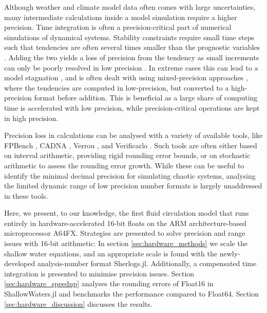 Although weather and climate model data often comes with large uncertainties, many intermediate calculations inside a model simulation
require a higher precision. Time integration is often a precision-critical part of numerical simulations of dynamical systems. Stability constraints
require small time steps such that tendencies are often several times smaller than the prognostic variables \citep{Courant1967}.
Adding the two yields a loss of precision from the tendency as small increments can only be poorly resolved in low precision
\citep{Gill1951,Kahan1965,Moller1965}. In extreme cases this can lead to a model stagnation \citep{Croci2020}, and is often
dealt with using mixed-precision approaches \citep{Dawson2018,Klower2020b,TintoPrims2019}, where the tendencies are computed
in low-precision, but converted to a high-precision format before addition. This is beneficial as a large share of computing time is
accelerated with low precision, while precision-critical operations are kept in high precision.

Precision loss in calculations can be analysed with a variety of available tools, like FPBench \citep{Damouche2017},
CADNA \citep{Jezequel2008}, Verrou \citep{Fevotte2019}, and Verificarlo \citep{Denis2016}. Such tools are often either
based on interval arithmetic, providing rigid rounding error bounds, or on stochastic arithmetic to assess the rounding error growth.
While these can be useful to identify the minimal decimal precision for simulating chaotic systems, analysing the limited dynamic range
of low precision number formats is largely unaddressed in these tools.

Here, we present, to our knowledge, the first fluid circulation model that runs entirely in hardware-accelerated 16-bit floats on the
ARM architecture-based microprocessor A64FX. Strategies are presented to solve precision and range issues with 16-bit arithmetic:
In section \ref{sec:hardware_methods} we scale the shallow water equations, and an appropriate scale is found with the
newly-developed analysis-number format Sherlogs.jl. Additionally, a compensated time integration is presented to minimise
precision issues. Section \ref{sec:hardware_speedup} analyses the rounding errors of Float16 in ShallowWaters.jl and
benchmarks the performance compared to Float64. Section \ref{sec:hardware_discussion} discusses the results.

